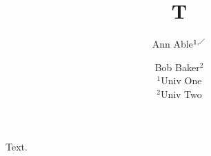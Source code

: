 \documentclass{article}
\title{T}
\author{Ann Able$^{1,\tikz{\draw (0,0) -- (0.2,0.2);}}$ \and Bob Baker$^{2}$\\ $^1$Univ One \\ $^2$Univ Two}
\begin{document}
\maketitle
Text.
\end{document}
